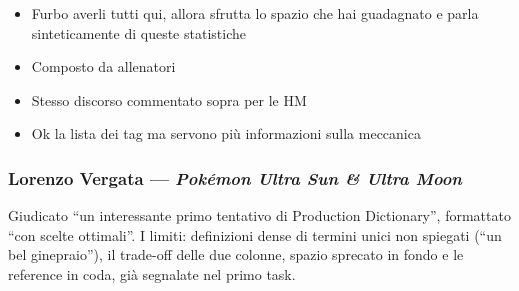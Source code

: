 {\begin{itemize}
  \item {} Furbo averli tutti qui, allora sfrutta lo spazio che hai guadagnato e parla sinteticamente di queste statistiche
  \item {} Composto da allenatori
  \item {} Stesso discorso commentato sopra per le HM
  \item {} Ok la lista dei tag ma servono più informazioni sulla meccanica
\end{itemize}
}

\subsubsection{Lorenzo Vergata --- \emph{Pokémon Ultra Sun \& Ultra Moon}}
Giudicato ``un interessante primo tentativo di Production Dictionary'',
formattato ``con scelte ottimali''. I limiti: definizioni dense di termini
unici non spiegati (``un bel ginepraio''), il trade-off delle due colonne,
spazio sprecato in fondo e le reference in coda, già segnalate nel primo
task.
